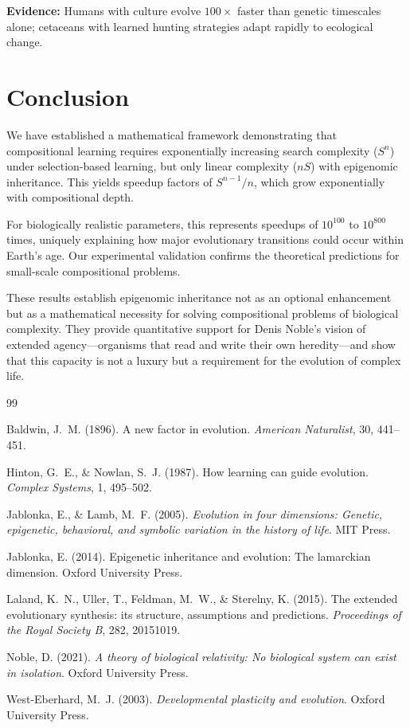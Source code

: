 \documentclass[11pt]{article}
\theoremstyle{definition}
\begin{document}
\textbf{Evidence:} Humans with culture evolve $100\times$ faster than genetic timescales alone; cetaceans with learned hunting strategies adapt rapidly to ecological change.

\section{Conclusion}

We have established a mathematical framework demonstrating that compositional learning requires exponentially increasing search complexity ($S^n$) under selection-based learning, but only linear complexity ($nS$) with epigenomic inheritance. This yields speedup factors of $S^{n-1}/n$, which grow exponentially with compositional depth.

For biologically realistic parameters, this represents speedups of $10^{100}$ to $10^{800}$ times, uniquely explaining how major evolutionary transitions could occur within Earth's age. Our experimental validation confirms the theoretical predictions for small-scale compositional problems.

These results establish epigenomic inheritance not as an optional enhancement but as a mathematical necessity for solving compositional problems of biological complexity. They provide quantitative support for Denis Noble's vision of extended agency---organisms that read and write their own heredity---and show that this capacity is not a luxury but a requirement for the evolution of complex life.

\begin{thebibliography}{99}

Baldwin, J.~M. (1896). A new factor in evolution. \textit{American Naturalist}, 30, 441--451.

Hinton, G.~E., \& Nowlan, S.~J. (1987). How learning can guide evolution. \textit{Complex Systems}, 1, 495--502.

Jablonka, E., \& Lamb, M.~F. (2005). \textit{Evolution in four dimensions: Genetic, epigenetic, behavioral, and symbolic variation in the history of life}. MIT Press.

Jablonka, E. (2014). Epigenetic inheritance and evolution: The lamarckian dimension. Oxford University Press.

Laland, K.~N., Uller, T., Feldman, M.~W., \& Sterelny, K. (2015). The extended evolutionary synthesis: its structure, assumptions and predictions. \textit{Proceedings of the Royal Society B}, 282, 20151019.

Noble, D. (2021). \textit{A theory of biological relativity: No biological system can exist in isolation}. Oxford University Press.

West-Eberhard, M.~J. (2003). \textit{Developmental plasticity and evolution}. Oxford University Press.

\end{thebibliography}
\end{document}
